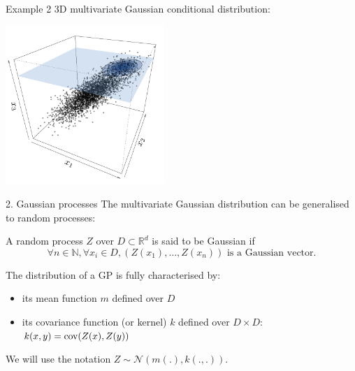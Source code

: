 \begin{frame}{}
\begin{exampleblock}{Example 2}
3D multivariate Gaussian conditional distribution:\\
\begin{center}
\includegraphics[height=6cm]{1_stat_models/figures/ch1_condpdf2}
\end{center}
\end{exampleblock}
\end{frame}



\begin{frame}{2. Gaussian processes}
The multivariate Gaussian distribution can be generalised to random processes:
\begin{definition}
A random process $Z$ over $D \subset \mathds{R}^d$ is said to be Gaussian if
\begin{equation*}
\forall n \in \mathds{N}, \forall x_i \in D, (Z(x_1),\dots,Z(x_n)) \text{  is a Gaussian vector}.
\end{equation*}
\end{definition}
The distribution of a GP is fully characterised by:
\begin{itemize}
	\item its mean function $m$ defined over $D$
	\item its covariance function (or kernel) $k$ defined over $D \times D$: $k(x,y) = \operatorname*{cov}(Z(x),Z(y))$
\end{itemize}
We will use the notation $Z \sim \mathcal{N}(m(.),k(.,.))$.
\end{frame}


